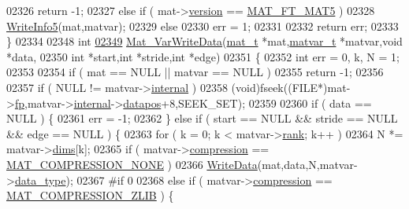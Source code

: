 \begin{DoxyCode}
{{{{{{{{{{{{{{{{{{{{{{{{{{{{{{{{{{{{{{{{{{{02326         \textcolor{keywordflow}{return} -1;
02327     \textcolor{keywordflow}{else} \textcolor{keywordflow}{if} ( mat->\hyperlink{struct__mat__t_a729c2bc0afc97485057a5af425635b1a}{version} == \hyperlink{group___m_a_t_ggad03442b8378999189d510e3745c702b7a31ade1f6989411dc0299007e2c7d33b2}{MAT\_FT\_MAT5} )
02328         \hyperlink{mat5_8c_a80e4ba45ec110d05657f8f39ffd9ee27}{WriteInfo5}(mat,matvar);
02329     \textcolor{keywordflow}{else}
02330         err = 1;
02331 
02332     \textcolor{keywordflow}{return} err;
02333 \}
02334 
02348 \textcolor{keywordtype}{int}
\hyperlink{group___m_a_t_ga43179b930fb30c025a153a55a083a98a}{02349} \hyperlink{group___m_a_t_ga43179b930fb30c025a153a55a083a98a}{Mat\_VarWriteData}(\hyperlink{struct__mat__t}{mat\_t} *mat,\hyperlink{group___m_a_t_structmatvar__t}{matvar\_t} *matvar,\textcolor{keywordtype}{void} *data,
02350       \textcolor{keywordtype}{int} *start,\textcolor{keywordtype}{int} *stride,\textcolor{keywordtype}{int} *edge)
02351 \{
02352     \textcolor{keywordtype}{int} err = 0, k, N = 1;
02353 
02354     \textcolor{keywordflow}{if} ( mat == NULL || matvar == NULL )
02355         \textcolor{keywordflow}{return} -1;
02356 
02357     \textcolor{keywordflow}{if} ( NULL != matvar->\hyperlink{group___m_a_t_a6e97e3ed9f40c49322c18561c2a94e92}{internal} )
02358         (void)fseek((FILE*)mat->\hyperlink{struct__mat__t_a85f562e407ca9ad4d2a6e14f839432b7}{fp},matvar->\hyperlink{group___m_a_t_a6e97e3ed9f40c49322c18561c2a94e92}{internal}->\hyperlink{structmatvar__internal_afd3bfaab126a160bd6855563e1ea0a7e}{datapos}+8,SEEK\_SET);
02359 
02360     \textcolor{keywordflow}{if} ( data == NULL ) \{
02361         err = -1;
02362     \} \textcolor{keywordflow}{else} \textcolor{keywordflow}{if} ( start == NULL && stride == NULL && edge == NULL ) \{
02363         \textcolor{keywordflow}{for} ( k = 0; k < matvar->\hyperlink{group___m_a_t_a84ba70c96ded13cc555fa75b768d9921}{rank}; k++ )
02364             N *= matvar->\hyperlink{group___m_a_t_a8e01234e1c862ce3472bb37f5a09b92c}{dims}[k];
02365         if ( matvar->\hyperlink{group___m_a_t_aeef0466048621cb2c959ba7f6c774d06}{compression} == \hyperlink{group___m_a_t_gga768c318af97bd2567758ecb001ceb7f4a2280b97631ff5dd24dec55261dc587b6}{MAT\_COMPRESSION\_NONE} )
02366             \hyperlink{mat5_8c_a1bec2ccf2a3b48706edd32e63744d364}{WriteData}(mat,data,N,matvar->\hyperlink{group___m_a_t_ab6aafe9bd77f0f077852593dec438144}{data\_type});
02367 \textcolor{preprocessor}{#if 0}
02368         \textcolor{keywordflow}{else} \textcolor{keywordflow}{if} ( matvar->\hyperlink{group___m_a_t_aeef0466048621cb2c959ba7f6c774d06}{compression} == \hyperlink{group___m_a_t_gga768c318af97bd2567758ecb001ceb7f4a5181d2f71eab0f12f05ba65d4f13fb53}{MAT\_COMPRESSION\_ZLIB} ) \{
}}}}}}}}}}}}}}}}}}}}}}}}}}}}}}}}}}}}}}}}}}}
\end{DoxyCode}
